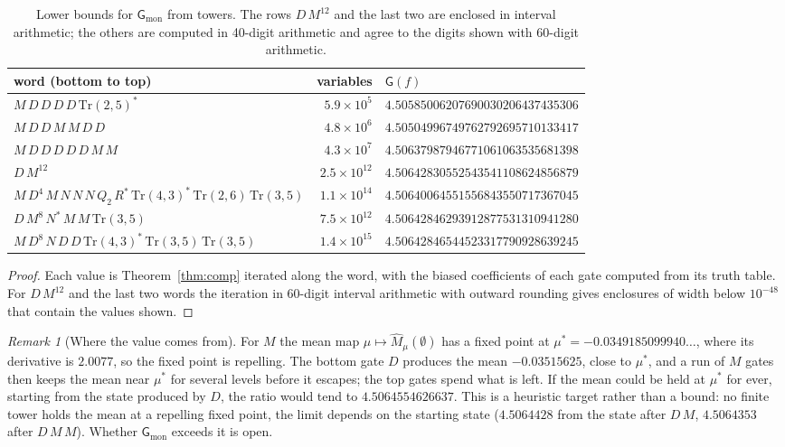 \documentclass[11pt]{amsart}
\theoremstyle{definition}
\theoremstyle{remark}
\newtheorem{remark}[theorem]{Remark}
\newcommand{\G}{\mathsf{G}}
\begin{document}
\begin{table}[tbp]
\centering
\small
\setlength{\tabcolsep}{4pt}
\begin{tabular}{lrl}
\toprule
word (bottom to top) & variables & $\G(f)$\\\midrule
$M\,D\,D\,D\,D\,\mathrm{Tr}(2,5)^\ast$ & $5.9\times10^{5}$ & $4.50585006207690030206437435306$\\
$M\,D\,D\,M\,M\,D\,D$ & $4.8\times10^{6}$ & $4.50504996749762792695710133417$\\
$M\,D\,D\,D\,D\,D\,M\,M$ & $4.3\times10^{7}$ & $4.50637987946771061063535681398$\\
$D\,M^{12}$ & $2.5\times10^{12}$ & $4.50642830552543541108624856879$\\
$M\,D^4\,M\,N\,N\,N\,Q_2\,R^\ast\,\mathrm{Tr}(4,3)^\ast\,\mathrm{Tr}(2,6)\,\mathrm{Tr}(3,5)$ & $1.1\times10^{14}$ & $4.50640064551556843550717367045$\\
$D\,M^{8}\,N^\ast\,M\,M\,\mathrm{Tr}(3,5)$ & $7.5\times10^{12}$ & $4.50642846293912877531310941280$\\
$M\,D^{8}\,N\,D\,D\,\mathrm{Tr}(4,3)^\ast\,\mathrm{Tr}(3,5)\,\mathrm{Tr}(3,5)$ & $1.4\times10^{15}$ & $4.50642846544523317790928639245$\\
\bottomrule
\end{tabular}
\caption{Lower bounds for $\G_{\mathrm{mon}}$ from towers. The rows $D\,M^{12}$ and the last two are enclosed in
interval arithmetic; the others are computed in 40-digit arithmetic and agree to the digits shown with 60-digit
arithmetic.}
\label{tab:towers}
\end{table}

\begin{proof}
Each value is Theorem~\ref{thm:comp} iterated along the word, with the biased coefficients of each gate computed
from its truth table. For $D\,M^{12}$ and the last two words the iteration in 60-digit interval arithmetic with
outward rounding gives enclosures of width below $10^{-48}$ that contain the values shown.
\end{proof}

\begin{remark}[Where the value comes from]
For $M$ the mean map $\mu\mapsto\hat M_\mu(\emptyset)$ has a fixed point at $\mu^\ast=-0.0349185099940\dots$, where
its derivative is $2.0077$, so the fixed point is repelling. The bottom gate $D$ produces the mean
$-0.03515625$, close to $\mu^\ast$, and a run of $M$ gates then keeps the mean near $\mu^\ast$ for several levels
before it escapes; the top gates spend what is left. If the mean could be held at $\mu^\ast$ for ever, starting from
the state produced by $D$, the ratio would tend to $4.5064554626637$. This is a heuristic target rather than a
bound: no finite tower holds the mean at a repelling fixed point, the limit depends on the starting state
($4.5064428$ from the state after $D\,M$, $4.5064353$ after $D\,M\,M$). Whether $\G_{\mathrm{mon}}$ exceeds it is
open.
\end{remark}
\end{document}
